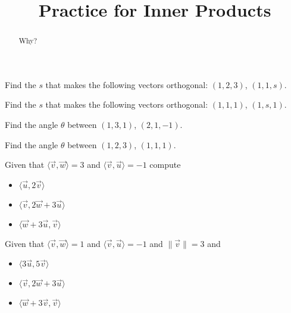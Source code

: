 \documentclass{ximera}
\title{Practice for Inner Products}
\begin{document}
\begin{abstract}
Why?
\end{abstract}
\maketitle



\begin{exercise}
    Find the $s$ that makes the following vectors orthogonal: $(1,2,3)$, $(1,1,s)$.
\end{exercise}

\begin{exercise}%
    Find the $s$ that makes the following vectors orthogonal: $(1,1,1)$, $(1,s,1)$.
\end{exercise}


\begin{exercise}
    Find the angle $\theta$ between $(1,3,1)$, $(2,1,-1)$.
\end{exercise}

\begin{exercise}
    Find the angle $\theta$ between $(1,2,3)$, $(1,1,1)$.
\end{exercise}


\begin{exercise}
    Given that $\langle \vec{v} , \vec{w} \rangle = 3$ and $\langle \vec{v} , \vec{u} \rangle = -1$ compute
    \begin{itemize}
        \item $\langle \vec{u} , 2 \vec{v} \rangle$
        \item $\langle \vec{v} , 2 \vec{w} + 3 \vec{u} \rangle$
        \item $\langle \vec{w} + 3 \vec{u}, \vec{v} \rangle$
    \end{itemize}
\end{exercise}

\begin{exercise}
    Given that $\langle \vec{v} , \vec{w} \rangle = 1$ and $\langle \vec{v} , \vec{u} \rangle = -1$  and $\lVert \vec{v} \rVert = 3$  and
    \begin{itemize}
        \item $\langle 3 \vec{u} , 5 \vec{v} \rangle$
        \item $\langle \vec{v} , 2 \vec{w} + 3 \vec{u} \rangle$
        \item $\langle \vec{w} + 3 \vec{v}, \vec{v} \rangle$
    \end{itemize}
\end{exercise}
\end{document}
